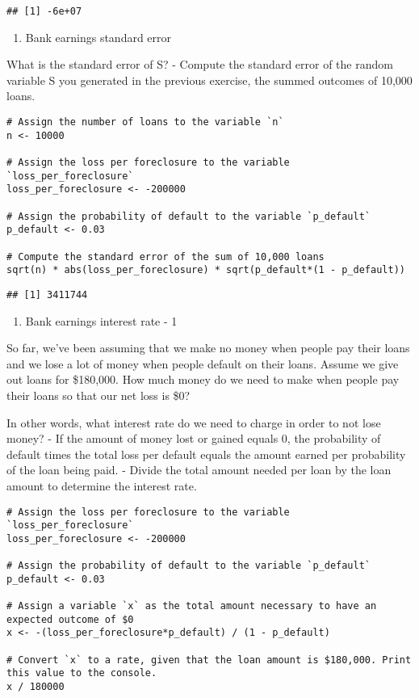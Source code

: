 \documentclass[
]{article}
\providecommand{\tightlist}{%
  \setlength{\itemsep}{0pt}\setlength{\parskip}{0pt}}
\begin{document}
\begin{verbatim}
## [1] -6e+07
\end{verbatim}

\begin{enumerate}
\def\labelenumi{\arabic{enumi}.}
\setcounter{enumi}{3}
\tightlist
\item
  Bank earnings standard error
\end{enumerate}

What is the standard error of S? - Compute the standard error of the
random variable S you generated in the previous exercise, the summed
outcomes of 10,000 loans.

\begin{verbatim}
# Assign the number of loans to the variable `n`
n <- 10000

# Assign the loss per foreclosure to the variable `loss_per_foreclosure`
loss_per_foreclosure <- -200000

# Assign the probability of default to the variable `p_default`
p_default <- 0.03

# Compute the standard error of the sum of 10,000 loans
sqrt(n) * abs(loss_per_foreclosure) * sqrt(p_default*(1 - p_default))
\end{verbatim}

\begin{verbatim}
## [1] 3411744
\end{verbatim}

\begin{enumerate}
\def\labelenumi{\arabic{enumi}.}
\setcounter{enumi}{4}
\tightlist
\item
  Bank earnings interest rate - 1
\end{enumerate}

So far, we've been assuming that we make no money when people pay their
loans and we lose a lot of money when people default on their loans.
Assume we give out loans for \$180,000. How much money do we need to
make when people pay their loans so that our net loss is \$0?

In other words, what interest rate do we need to charge in order to not
lose money? - If the amount of money lost or gained equals 0, the
probability of default times the total loss per default equals the
amount earned per probability of the loan being paid. - Divide the total
amount needed per loan by the loan amount to determine the interest
rate.

\begin{verbatim}
# Assign the loss per foreclosure to the variable `loss_per_foreclosure`
loss_per_foreclosure <- -200000

# Assign the probability of default to the variable `p_default`
p_default <- 0.03

# Assign a variable `x` as the total amount necessary to have an expected outcome of $0
x <- -(loss_per_foreclosure*p_default) / (1 - p_default)

# Convert `x` to a rate, given that the loan amount is $180,000. Print this value to the console.
x / 180000
\end{verbatim}
\end{document}

